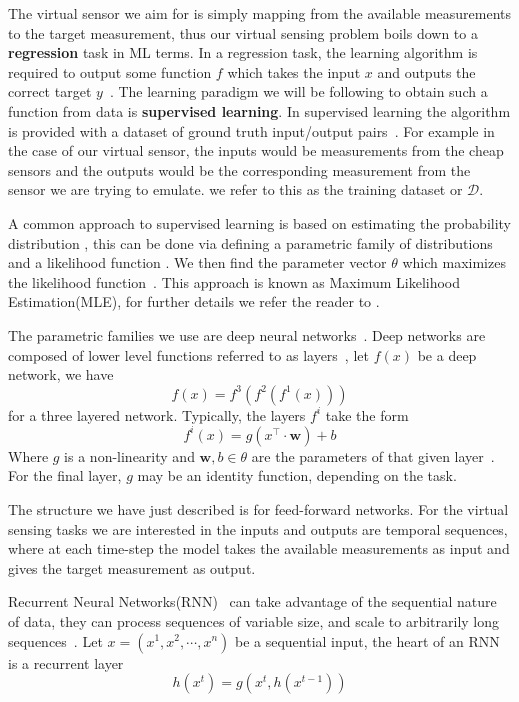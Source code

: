 \documentclass[../main.tex]{subfiles}
\begin{document}
The virtual sensor we aim for is simply mapping from the available measurements to the target measurement, thus our virtual sensing problem boils down to a \textbf{regression} task in ML terms. In a regression task, the learning algorithm is required to output some function $f$ which takes the input $x$ and outputs the correct target $y$~\citep[chapter~5]{goodfellow2016deep}. The learning paradigm we will be following to obtain such a function from data is \textbf{supervised learning}. In supervised learning the algorithm is provided with a dataset of ground truth input/output pairs~\citep[chapter~5]{goodfellow2016deep}. For example in the case of our virtual sensor, the inputs would be measurements from the cheap sensors and the outputs would be the corresponding measurement from the sensor we are trying to emulate. we refer to this as the training dataset or $\mathcal{D}$. 

A common approach to supervised learning is based on estimating the probability distribution , this can be done via defining a parametric family of distributions  and a likelihood function . We then find the parameter vector $\theta$ which maximizes the likelihood function~\citep[chapter~5]{goodfellow2016deep}. This approach is known as Maximum Likelihood Estimation(MLE), for further details we refer the reader to \cite[chapter~5]{goodfellow2016deep}. 

The parametric families we use are deep neural networks~\citep{goodfellow2016deep}. Deep networks are composed of lower level functions referred to as layers~\citep[chapter~6]{goodfellow2016deep}, let $f(x)$ be a deep network, we have  
$$
    f(x) = f^3(f^2(f^1(x)))
$$
for a three layered network. Typically, the layers $f^i$ take the form 
$$
    f^i(x) = g(x^\top \cdot \mathbf{w}) + b
$$
Where $g$ is a non-linearity and $\mathbf{w}, b \in \theta$ are the parameters of that given layer~\citep[chapter~6]{goodfellow2016deep}. For the final layer, $g$ may be an identity function, depending on the task.

The structure we have just described is for feed-forward networks.
For the virtual sensing tasks we are interested in the inputs and outputs are temporal sequences, where at each time-step the model takes the available measurements as input and gives the target measurement as output.

Recurrent Neural Networks(RNN)~\citep{rumelhart1986learning} can take advantage of the sequential nature of data, they can process sequences of variable size, and scale to arbitrarily long sequences~\citep[chapter~10]{goodfellow2016deep}.
Let $x=(x^1, x^2, \cdots, x^n)$ be a sequential input, the heart of an RNN is a recurrent layer
$$
    h(x^t) = g(x^t, h(x^{t-1}))
$$
\end{document}

